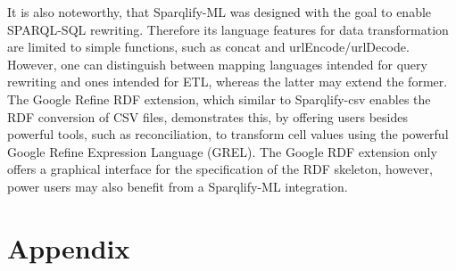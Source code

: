 \documentclass[a4paper,twoside,bibtotoc,abstracton,12pt,BCOR=15mm]{scrreprt}
\begin{document}
It is also noteworthy, that Sparqlify-ML was designed with the goal to enable SPARQL-SQL rewriting.
Therefore its language features for data transformation are limited to simple functions,
such as concat and urlEncode/urlDecode.
However, one can distinguish between mapping languages intended for query rewriting and ones intended for
ETL, whereas the latter may extend the former.
The Google Refine RDF extension, which similar to Sparqlify-csv enables the RDF conversion of CSV files,
demonstrates this, by offering users besides powerful tools, such as reconciliation, to transform cell values using the powerful Google Refine Expression Language (GREL).  
The Google RDF extension only offers a graphical interface for the specification of the RDF skeleton, however, power users
may also benefit from a Sparqlify-ML integration.


\chapter{Appendix}
\end{document}
